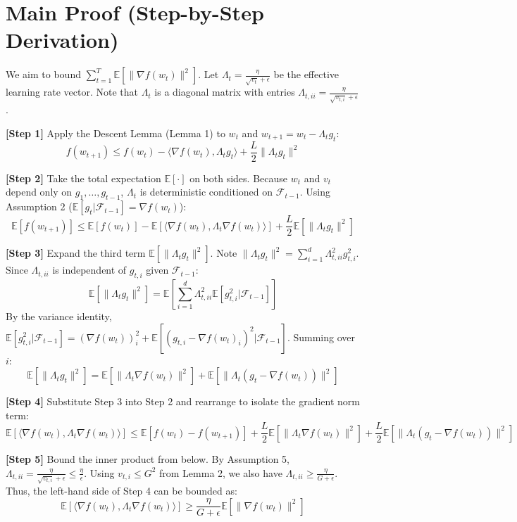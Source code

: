 \documentclass{article}
\begin{document}
\section*{Main Proof (Step-by-Step Derivation)}
We aim to bound $\sum_{t=1}^T \mathbb{E}[\|\nabla f(w_t)\|^2]$. Let $\Lambda_t = \frac{\eta}{\sqrt{v_t} + \epsilon}$ be the effective learning rate vector. Note that $\Lambda_t$ is a diagonal matrix with entries $\Lambda_{t,ii} = \frac{\eta}{\sqrt{v_{t,i}} + \epsilon}$.

\textbf{[Step 1]} Apply the Descent Lemma (Lemma 1) to $w_t$ and $w_{t+1} = w_t - \Lambda_t g_t$:
$$ f(w_{t+1}) \leq f(w_t) - \langle \nabla f(w_t), \Lambda_t g_t \rangle + \frac{L}{2} \|\Lambda_t g_t\|^2 $$

\textbf{[Step 2]} Take the total expectation $\mathbb{E}[\cdot]$ on both sides. Because $w_t$ and $v_t$ depend only on $g_1, \dots, g_{t-1}$, $\Lambda_t$ is deterministic conditioned on $\mathcal{F}_{t-1}$. Using Assumption 2 ($\mathbb{E}[g_t | \mathcal{F}_{t-1}] = \nabla f(w_t)$):
$$ \mathbb{E}[f(w_{t+1})] \leq \mathbb{E}[f(w_t)] - \mathbb{E}[\langle \nabla f(w_t), \Lambda_t \nabla f(w_t) \rangle] + \frac{L}{2} \mathbb{E}[\|\Lambda_t g_t\|^2] $$

\textbf{[Step 3]} Expand the third term $\mathbb{E}[\|\Lambda_t g_t\|^2]$. Note $\|\Lambda_t g_t\|^2 = \sum_{i=1}^d \Lambda_{t,ii}^2 g_{t,i}^2$. Since $\Lambda_{t,ii}$ is independent of $g_{t,i}$ given $\mathcal{F}_{t-1}$:
$$ \mathbb{E}[\|\Lambda_t g_t\|^2] = \mathbb{E}\left[ \sum_{i=1}^d \Lambda_{t,ii}^2 \mathbb{E}[g_{t,i}^2 | \mathcal{F}_{t-1}] \right] $$
By the variance identity, $\mathbb{E}[g_{t,i}^2 | \mathcal{F}_{t-1}] = (\nabla f(w_t))_i^2 + \mathbb{E}[(g_{t,i} - \nabla f(w_t)_i)^2 | \mathcal{F}_{t-1}]$. Summing over $i$:
$$ \mathbb{E}[\|\Lambda_t g_t\|^2] = \mathbb{E}[\|\Lambda_t \nabla f(w_t)\|^2] + \mathbb{E}[\|\Lambda_t (g_t - \nabla f(w_t))\|^2] $$

\textbf{[Step 4]} Substitute Step 3 into Step 2 and rearrange to isolate the gradient norm term:
$$ \mathbb{E}[\langle \nabla f(w_t), \Lambda_t \nabla f(w_t) \rangle] \leq \mathbb{E}[f(w_t) - f(w_{t+1})] + \frac{L}{2} \mathbb{E}[\|\Lambda_t \nabla f(w_t)\|^2] + \frac{L}{2} \mathbb{E}[\|\Lambda_t (g_t - \nabla f(w_t))\|^2] $$

\textbf{[Step 5]} Bound the inner product from below. By Assumption 5, $\Lambda_{t,ii} = \frac{\eta}{\sqrt{v_{t,i}} + \epsilon} \leq \frac{\eta}{\epsilon}$. Using $v_{t,i} \leq G^2$ from Lemma 2, we also have $\Lambda_{t,ii} \geq \frac{\eta}{G + \epsilon}$. Thus, the left-hand side of Step 4 can be bounded as:
$$ \mathbb{E}[\langle \nabla f(w_t), \Lambda_t \nabla f(w_t) \rangle] \geq \frac{\eta}{G + \epsilon} \mathbb{E}[\|\nabla f(w_t)\|^2] $$
\end{document}
